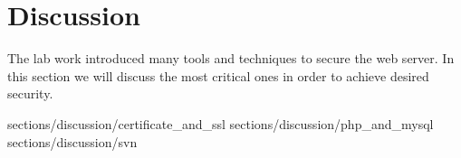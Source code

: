 \section {Discussion}

The lab work introduced many tools and techniques to secure the web server. In this section we will discuss the most critical ones in order to achieve desired security. 


 {sections/discussion/certificate_and_ssl}
 {sections/discussion/php_and_mysql}
 {sections/discussion/svn} %

